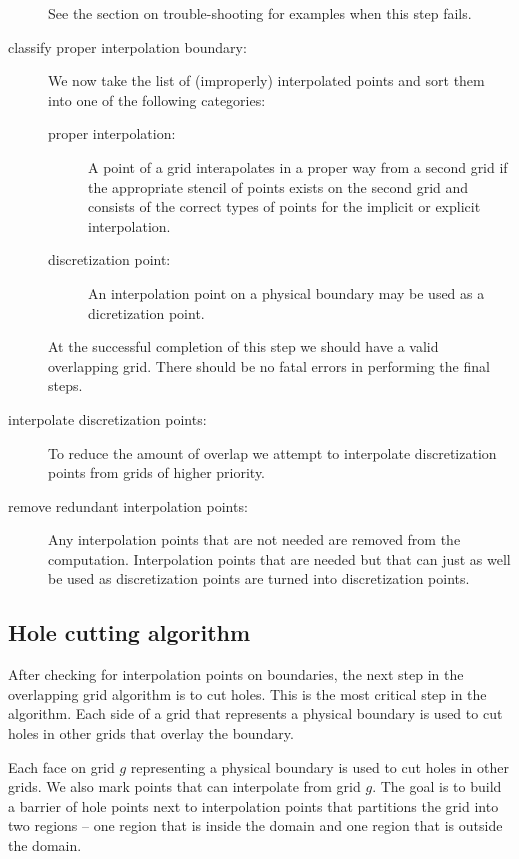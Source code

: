 \begin{description}
     See the section on trouble-shooting for examples when this step fails.
  \item[classify proper interpolation boundary:] 
        We now take the list of (improperly) interpolated
     points and sort them into one of the following categories:
      \begin{description}
        \item[proper interpolation:] A point of a grid interapolates in a proper way from
          a second grid if the appropriate stencil of points exists on the second grid
          and consists of the correct types of points for the implicit or explicit interpolation.
        \item[discretization point:] An interpolation point on a physical boundary may
            be used as a dicretization point.
      \end{description}
     At the successful completion of this step we should have a valid overlapping grid. 
     There should be no fatal errors in performing the final steps.
  \item[interpolate discretization points:] To reduce the amount of overlap we
        attempt to interpolate discretization points from grids of higher priority.
  \item[remove redundant interpolation points:] 
      Any interpolation points that 
      are not needed are removed from the computation. Interpolation points that are
      needed but that can just as well be used as discretization points are turned
      into discretization points.
\end{description}

  

\subsection{Hole cutting algorithm}

After checking for interpolation points on boundaries, the next step in the overlapping
grid algorithm is to cut holes. This is the most critical step in the algorithm. 
Each side of a grid that represents a physical boundary is used to cut holes in other grids that
overlay the boundary.

Each face on grid $g$  representing a physical boundary is used to cut holes in other grids.
We also mark points that can interpolate from grid $g$. The goal is to build a barrier of
hole points next to interpolation points that partitions the grid into two regions -- one region
that is inside the domain and one region that is outside the domain.

